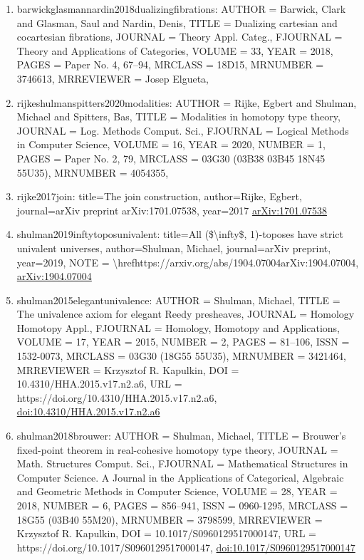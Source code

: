 \documentclass[11pt]{article}
\begin{document}
\begin{enumerate}[leftmargin=*]
  \item barwickglasmannardin2018dualizingfibrations: AUTHOR = Barwick, Clark and Glasman, Saul and Nardin, Denis, TITLE = Dualizing cartesian and cocartesian fibrations, JOURNAL = Theory Appl. Categ., FJOURNAL = Theory and Applications of Categories, VOLUME = 33, YEAR = 2018, PAGES = Paper No. 4, 67--94, MRCLASS = 18D15, MRNUMBER = 3746613, MRREVIEWER = Josep Elgueta,
  \item rijkeshulmanspitters2020modalities: AUTHOR = Rijke, Egbert and Shulman, Michael and Spitters, Bas, TITLE = Modalities in homotopy type theory, JOURNAL = Log. Methods Comput. Sci., FJOURNAL = Logical Methods in Computer Science, VOLUME = 16, YEAR = 2020, NUMBER = 1, PAGES = Paper No. 2, 79, MRCLASS = 03G30 (03B38 03B45 18N45 55U35), MRNUMBER = 4054355,
  \item rijke2017join: title=The join construction, author=Rijke, Egbert, journal=arXiv preprint arXiv:1701.07538, year=2017 \href{https://arxiv.org/abs/1701.07538}{arXiv:1701.07538}
  \item shulman2019inftytoposunivalent: title=All (\$\textbackslash{}infty\$, 1)-toposes have strict univalent universes, author=Shulman, Michael, journal=arXiv preprint, year=2019, NOTE = \textbackslash{}hrefhttps://arxiv.org/abs/1904.07004arXiv:1904.07004, \href{https://arxiv.org/abs/1904.07004}{arXiv:1904.07004}
  \item shulman2015elegantunivalence: AUTHOR = Shulman, Michael, TITLE = The univalence axiom for elegant Reedy presheaves, JOURNAL = Homology Homotopy Appl., FJOURNAL = Homology, Homotopy and Applications, VOLUME = 17, YEAR = 2015, NUMBER = 2, PAGES = 81--106, ISSN = 1532-0073, MRCLASS = 03G30 (18G55 55U35), MRNUMBER = 3421464, MRREVIEWER = Krzysztof R. Kapulkin, DOI = 10.4310/HHA.2015.v17.n2.a6, URL = https://doi.org/10.4310/HHA.2015.v17.n2.a6, \href{https://doi.org/10.4310/HHA.2015.v17.n2.a6}{doi:10.4310/HHA.2015.v17.n2.a6}
  \item shulman2018brouwer: AUTHOR = Shulman, Michael, TITLE = Brouwer's fixed-point theorem in real-cohesive homotopy type theory, JOURNAL = Math. Structures Comput. Sci., FJOURNAL = Mathematical Structures in Computer Science. A Journal in the Applications of Categorical, Algebraic and Geometric Methods in Computer Science, VOLUME = 28, YEAR = 2018, NUMBER = 6, PAGES = 856--941, ISSN = 0960-1295, MRCLASS = 18G55 (03B40 55M20), MRNUMBER = 3798599, MRREVIEWER = Krzysztof R. Kapulkin, DOI = 10.1017/S0960129517000147, URL = https://doi.org/10.1017/S0960129517000147, \href{https://doi.org/10.1017/S0960129517000147}{doi:10.1017/S0960129517000147}

\end{enumerate}
\end{document}
